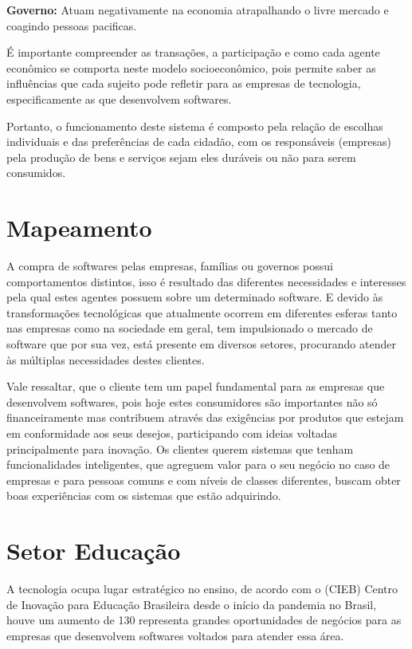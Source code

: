 \documentclass[
12pt,				%
oneside,			%
a4paper,			%
section=TITLE,
brazil,				%
]{abntex2}
\let\oldsection\section
\renewcommand\section{\clearpage\oldsection}
\begin{document}
  \textbf{Governo:} Atuam negativamente na economia atrapalhando o livre
  mercado e coagindo pessoas pacificas.

  É importante compreender as transações, a participação e como cada agente
  econômico se comporta neste modelo socioeconômico, pois permite saber as
  influências que cada sujeito pode refletir para as empresas de tecnologia,
  especificamente as que desenvolvem softwares.

  Portanto, o funcionamento deste sistema é composto pela relação de escolhas
  individuais e das preferências de cada cidadão, com os responsáveis (empresas)
  pela produção de bens e serviços sejam eles duráveis ou não para serem
  consumidos.

  \section{Mapeamento}

  A compra de softwares pelas empresas, famílias ou governos possui
  comportamentos distintos, isso é resultado das diferentes necessidades e
  interesses pela qual estes agentes  possuem sobre um determinado software. E
  devido às transformações tecnológicas que atualmente ocorrem em diferentes
  esferas tanto nas empresas como na sociedade em geral, tem impulsionado o
  mercado de software que por sua vez, está presente em diversos setores,
  procurando atender às múltiplas necessidades destes clientes.

  Vale ressaltar, que o cliente tem um papel fundamental para as empresas que
  desenvolvem softwares, pois hoje estes consumidores são importantes não só
  financeiramente mas contribuem através das exigências por produtos que estejam
  em conformidade aos seus desejos, participando com ideias voltadas
  principalmente para inovação. Os clientes querem sistemas que tenham
  funcionalidades inteligentes, que agreguem valor para o seu negócio no caso de
  empresas e para pessoas comuns e com níveis de classes diferentes, buscam obter
  boas experiências com os sistemas que estão adquirindo.

  \section{Setor Educação}

  A tecnologia ocupa lugar estratégico no ensino, de acordo com o (CIEB) Centro
  de Inovação para Educação Brasileira desde o início da pandemia no Brasil,
  houve um aumento de 130%
  representa grandes oportunidades de negócios para as empresas que desenvolvem
  softwares voltados para atender essa área.
\end{document}
